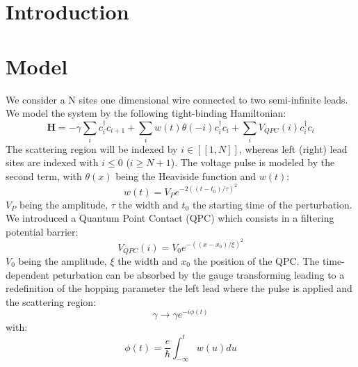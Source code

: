 \documentclass[aps,prl,preprint,groupedaddress]{revtex4-1}
\begin{document}
\section{Introduction}


\section{Model}
%
We consider a N sites one dimensional wire connected to two semi-infinite leads. We model the system by the following tight-binding Hamiltonian:
\begin{equation}
\textbf{H} = -\gamma \sum_{i}c^{\dagger}_i c_{i+1} + \sum_{i} w(t)\theta(-i) c^{\dagger}_i c_{i} + \sum_{i} V_{QPC}(i) c^{\dagger}_i c_{i}
\end{equation}
The scattering region will be indexed by $i \in [\![1,N]\!]$, whereas left (right) lead sites are indexed with $i \leq 0$
($i \geq N+1$). The voltage pulse is modeled by the second term, with $\theta(x)$ being the Heaviside function and $w(t)$:
\begin{equation}
w(t) = V_P e^{-2((t-t_0)/\tau)^2}
\end{equation}
$V_P$ being the amplitude, $\tau$ the width and $t_0$ the starting time of the perturbation. We introduced a Quantum Point Contact (QPC) which consists in a filtering potential barrier:
\begin{equation}
V_{QPC}(i) = V_0 e^{-((x-x_0)/\xi)^2}
\end{equation}
$V_0$ being the amplitude, $\xi$ the width and $x_0$ the position of the QPC.
The time-dependent peturbation can be absorbed by the gauge transforming leading to a redefinition of the hopping parameter the left lead where the pulse is applied and the scattering region:
\begin{equation}
\gamma \rightarrow \gamma e^{-i\phi(t)}
\end{equation}
with:
\begin{equation}
\phi(t) = \frac{e}{\hbar}\int_{-\infty}^{t} w(u)du
\end{equation}
\end{document}
